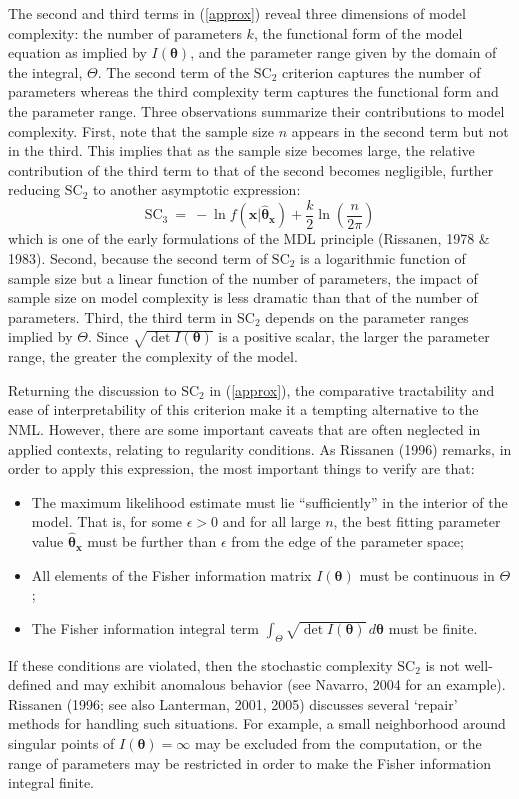\documentclass{elsart}
\begin{document}
The second and third terms in (\ref{approx}) reveal three dimensions of model complexity: the
number of parameters $k$, the functional form of the model equation as implied by $I(\bm\theta)$,
and the parameter range given by the domain of the integral, $\Theta$. The second term of the
$\mbox{SC}_2$ criterion captures the number of parameters whereas the third complexity term
captures the functional form and the parameter range. Three observations summarize their
contributions to model complexity. First, note that the sample size $n$ appears in the second term
but not in the third. This implies that as the sample size becomes large, the relative
contribution of the third term to that of the second becomes negligible, further reducing
$\mbox{SC}_2$ to another asymptotic expression:
\begin{equation}\label{sc3}
\mbox{SC}_3 ~ =~   -\ln f(\bm{x}|\hat{\bm{\theta}}_{\bm{x}}) + \frac{k}{2} \ln \left(
\frac{n}{2\pi} \right)
\end{equation}
which is one of the early formulations of the MDL principle (Rissanen, 1978 \& 1983). Second,
because the second term of $\mbox{SC}_2$ is a logarithmic function of sample size but a linear function
of the number of parameters, the impact of sample size on model complexity is less dramatic than
that of the number of parameters. Third, the third term in $\mbox{SC}_2$ depends on the parameter ranges
implied by $\Theta$. Since $\sqrt{\det I(\bm{\theta})}$ is a positive scalar,
the larger the parameter range, the greater the complexity of the model.


Returning the discussion to $\mbox{SC}_2$ in (\ref{approx}), the comparative tractability and ease
of interpretability of this criterion make it a tempting alternative to the NML. However, there
are some important caveats that are often neglected in applied contexts, relating to regularity
conditions. As Rissanen (1996) remarks, in order to apply this expression, the most important
things to verify are that:
\begin{itemize}
\item The maximum likelihood estimate must lie ``sufficiently'' in the interior of the model. That is,
for some $\epsilon > 0$ and for all large $n$, the best fitting parameter value $\hat{\bm
\theta}_{\bm x}$ must be further than $\epsilon$ from the edge of the parameter space;
\item All elements of the Fisher information matrix $I(\bm{\theta})$ must be continuous in $\Theta$;
\item The Fisher information integral term $\int_{\Theta} \sqrt{\det I(\bm{\theta})} \, d\bm{\theta}$ must
be finite.
\end{itemize}
If these conditions are violated, then the stochastic complexity $\mbox{SC}_2$ is not well-defined and
may exhibit anomalous behavior (see Navarro, 2004 for an example). Rissanen (1996; see also
Lanterman, 2001, 2005) discusses several `repair' methods for handling such situations. For
example, a small neighborhood around singular points of $I(\bm{\theta}) =\infty$ may be excluded
from the computation, or the range of parameters may be restricted in order to make the Fisher
information integral finite.
\end{document}
